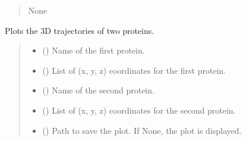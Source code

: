 \documentclass[letterpaper,10pt,english]{sphinxmanual}
\begin{document}
\begin{fulllineitems}
\begin{fulllineitems}
\begin{quote}
\begin{description}
\begin{itemize}
\end{itemize}

\sphinxAtStartPar
None

\end{description}\end{quote}

\end{fulllineitems}


\begin{fulllineitems}
\label{\detokenize{src:src.Analysis_Class.Analysis.plot_two_protein_trajectory}}
\pysigstartsignatures
{}
\pysigstopsignatures
\sphinxAtStartPar
Plots the 3D trajectories of two proteins.
\begin{quote}\begin{description}
\begin{itemize}
\item {} 
\sphinxAtStartPar
{} () \textendash{} Name of the first protein.

\item {} 
\sphinxAtStartPar
{} () \textendash{} List of (x, y, z) coordinates for the first protein.

\item {} 
\sphinxAtStartPar
{} () \textendash{} Name of the second protein.

\item {} 
\sphinxAtStartPar
{} () \textendash{} List of (x, y, z) coordinates for the second protein.

\item {} 
\sphinxAtStartPar
{} (\sphinxstyleliteralemphasis{\sphinxupquote{, }}) \textendash{} Path to save the plot. If None, the plot is displayed.


\end{itemize}
\end{description}
\end{quote}
\end{fulllineitems}
\end{fulllineitems}
\end{document}
